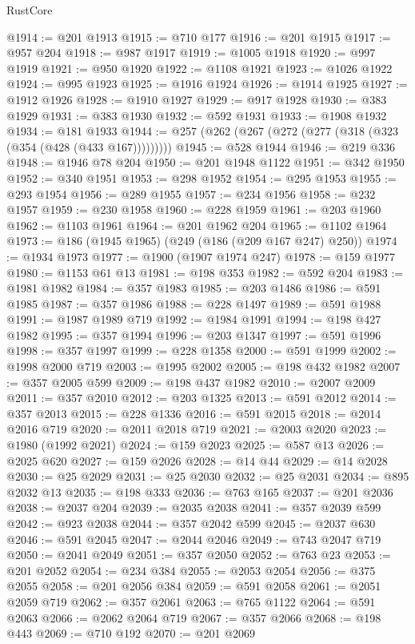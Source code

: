 \begin{lexlean}{RustCore}
\begin{coremodule}
@1914 := @201 @1913
@1915 := @710 @177
@1916 := @201 @1915
@1917 := @957 @204
@1918 := @987 @1917
@1919 := @1005 @1918
@1920 := @997 @1919
@1921 := @950 @1920
@1922 := @1108 @1921
@1923 := @1026 @1922
@1924 := @995 @1923
@1925 := @1916 @1924
@1926 := @1914 @1925
@1927 := @1912 @1926
@1928 := @1910 @1927
@1929 := @917 @1928
@1930 := @383 @1929
@1931 := @383 @1930
@1932 := @592 @1931
@1933 := @1908 @1932
@1934 := @181 @1933
@1944 := @257 (@262 (@267 (@272 (@277 (@318 (@323 (@354 (@428 (@433 @167)))))))))
@1945 := @528 @1944
@1946 := @219 @336
@1948 := @1946 @78 @204
@1950 := @201 @1948 @1122
@1951 := @342 @1950
@1952 := @340 @1951
@1953 := @298 @1952
@1954 := @295 @1953
@1955 := @293 @1954
@1956 := @289 @1955
@1957 := @234 @1956
@1958 := @232 @1957
@1959 := @230 @1958
@1960 := @228 @1959
@1961 := @203 @1960
@1962 := @1103 @1961
@1964 := @201 @1962 @204
@1965 := @1102 @1964
@1973 := @186 (@1945 @1965) (@249 (@186 (@209 @167 @247) @250))
@1974 := @1934 @1973
@1977 := @1900 (@1907 @1974 @247)
@1978 := @159 @1977
@1980 := @1153 @61 @13
@1981 := @198 @353
@1982 := @592 @204
@1983 := @1981 @1982
@1984 := @357 @1983
@1985 := @203 @1486
@1986 := @591 @1985
@1987 := @357 @1986
@1988 := @228 @1497
@1989 := @591 @1988
@1991 := @1987 @1989 @719
@1992 := @1984 @1991
@1994 := @198 @427 @1982
@1995 := @357 @1994
@1996 := @203 @1347
@1997 := @591 @1996
@1998 := @357 @1997
@1999 := @228 @1358
@2000 := @591 @1999
@2002 := @1998 @2000 @719
@2003 := @1995 @2002
@2005 := @198 @432 @1982
@2007 := @357 @2005 @599
@2009 := @198 @437 @1982
@2010 := @2007 @2009
@2011 := @357 @2010
@2012 := @203 @1325
@2013 := @591 @2012
@2014 := @357 @2013
@2015 := @228 @1336
@2016 := @591 @2015
@2018 := @2014 @2016 @719
@2020 := @2011 @2018 @719
@2021 := @2003 @2020
@2023 := @1980 (@1992 @2021)
@2024 := @159 @2023
@2025 := @587 @13
@2026 := @2025 @620
@2027 := @159 @2026
@2028 := @14 @44
@2029 := @14 @2028
@2030 := @25 @2029
@2031 := @25 @2030
@2032 := @25 @2031
@2034 := @895 @2032 @13
@2035 := @198 @333
@2036 := @763 @165
@2037 := @201 @2036
@2038 := @2037 @204
@2039 := @2035 @2038
@2041 := @357 @2039 @599
@2042 := @923 @2038
@2044 := @357 @2042 @599
@2045 := @2037 @630
@2046 := @591 @2045
@2047 := @2044 @2046
@2049 := @743 @2047 @719
@2050 := @2041 @2049
@2051 := @357 @2050
@2052 := @763 @23
@2053 := @201 @2052
@2054 := @234 @384
@2055 := @2053 @2054
@2056 := @375 @2055
@2058 := @201 @2056 @384
@2059 := @591 @2058
@2061 := @2051 @2059 @719
@2062 := @357 @2061
@2063 := @765 @1122
@2064 := @591 @2063
@2066 := @2062 @2064 @719
@2067 := @357 @2066
@2068 := @198 @443
@2069 := @710 @192
@2070 := @201 @2069

\end{coremodule}
\end{lexlean}
